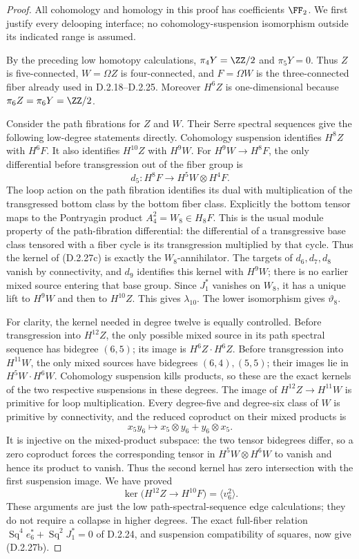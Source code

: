 \begin{proof}
All cohomology and homology in this proof has coefficients
$\FF_2$. We first justify every delooping interface; no
cohomology-suspension isomorphism outside its indicated range
is assumed.

By the preceding low homotopy calculations,
$\pi_4Y=\ZZ/2$ and $\pi_5Y=0$. Thus $Z$ is five-connected,
$W=\Omega Z$ is four-connected, and $F=\Omega W$ is the
three-connected fiber already used in \textup{D.2.18--D.2.25}.
Moreover $H^6Z$ is one-dimensional because
$\pi_6Z=\pi_6Y=\ZZ/2$.

Consider the path fibrations for $Z$ and $W$.
Their Serre spectral sequences give the following low-degree
statements directly. Cohomology suspension identifies $H^8Z$
with $H^6F$. It also identifies $H^{10}Z$ with $H^9W$.
For $H^9W\to H^8F$, the only differential before transgression
out of the fiber group is
\[
 d_5:H^8F\longrightarrow H^5W\otimes H^4F.
 \tag{D.2.27c}
\]
The loop action on the path fibration identifies its dual
with multiplication of the transgressed bottom class by the
bottom fiber class. Explicitly the bottom tensor maps to
the Pontryagin product $A_4^2=W_8\in H_8F$.
This is the usual module property of the path-fibration
differential: the differential of a transgressive base
class tensored with a fiber cycle is its transgression
multiplied by that cycle.
Thus the kernel of \textup{(D.2.27c)} is exactly the
$W_8$-annihilator. The targets of $d_6,d_7,d_8$ vanish by
connectivity, and $d_9$ identifies this kernel with $H^9W$;
there is no earlier mixed source entering that base group.
Since $J_1^*$ vanishes on $W_8$, it has a unique lift to
$H^9W$ and then to $H^{10}Z$. This gives $\lambda_{10}$.
The lower isomorphism gives $\vartheta_8$.

For clarity, the kernel needed in degree twelve is equally
controlled. Before transgression into $H^{12}Z$, the only
possible mixed source in its path spectral sequence has
bidegree $(6,5)$; its image is $H^6Z\cdot H^6Z$.
Before transgression into $H^{11}W$, the only mixed sources
have bidegrees $(6,4),(5,5)$; their images lie in
$H^5W\cdot H^6W$. Cohomology suspension kills products,
so these are the exact kernels of the two respective
suspensions in these degrees. The image of
$H^{12}Z\to H^{11}W$ is primitive for loop multiplication.
Every degree-five and degree-six class of $W$ is primitive
by connectivity, and the reduced coproduct on their mixed
products is
\[
 x_5y_6\longmapsto x_5\otimes y_6+y_6\otimes x_5.
 \tag{D.2.27d}
\]
It is injective on the mixed-product subspace: the two tensor
bidegrees differ, so a zero coproduct forces the corresponding
tensor in $H^5W\otimes H^6W$ to vanish and hence its product
to vanish. Thus the second kernel has zero intersection with
the first suspension image. We have proved
\[
 \ker\bigl(H^{12}Z\longrightarrow H^{10}F\bigr)
       =\langle v_6^2\rangle.
 \tag{D.2.27e}
\]
These arguments are just the low path-spectral-sequence edge
calculations; they do not require a collapse in higher degrees.
The exact full-fiber relation
$\operatorname{Sq}^4e_6^*+\operatorname{Sq}^2J_1^*=0$
of \textup{D.2.24}, and suspension compatibility of squares,
now give \textup{(D.2.27b)}.


\end{proof}
